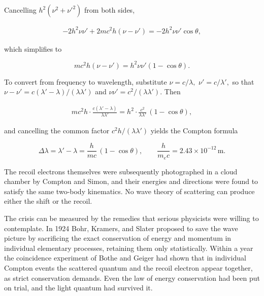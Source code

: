 Cancelling $h^{2}(\nu^{2}+\nu'^{2})$ from both sides,
\begin{linenomath}
    \begin{align}
        -2h^{2}\nu\nu'+2mc^{2}h(\nu-\nu')=-2h^{2}\nu\nu'\cos\theta,
    \end{align}
\end{linenomath}
which simplifies to
\begin{linenomath}
    \begin{equation}
        mc^2h(\nu-\nu')=h^2\nu\nu'(1-\cos\theta).
    \end{equation}
\end{linenomath}
To convert from frequency to wavelength, substitute $\nu=c/\lambda,$ $\nu'=c/\lambda',$ so that $\nu-\nu'=c(\lambda'-\lambda)/(\lambda\lambda')$ and $\nu\nu'=c^{2}/(\lambda\lambda').$ Then
\begin{linenomath}
    \begin{align}
        mc^{2}h\cdot\frac{c(\lambda'-\lambda)}{\lambda\lambda'}
        =h^{2}\cdot\frac{c^{2}}{\lambda\lambda'}\,(1-\cos\theta),
    \end{align}
\end{linenomath}
and cancelling the common factor $c^{2}h/(\lambda\lambda')$ yields the Compton formula
\begin{linenomath}
    \begin{equation}
        \Delta\lambda=\lambda'-\lambda=\frac{h}{mc}\,(1-\cos\theta),
        \qquad
        \frac{h}{m_ec}=2.43\times10^{-12}\,\mathrm{m}.
    \end{equation}
\end{linenomath}
The recoil electrons themselves were subsequently photographed in a cloud chamber by Compton and Simon, and their energies and directions were found to satisfy the same two-body kinematics. No wave theory of scattering can produce either the shift or the recoil.

The crisis can be measured by the remedies that serious physicists were willing to contemplate. In 1924 Bohr, Kramers, and Slater proposed to save the wave picture by sacrificing the exact conservation of energy and momentum in individual elementary processes, retaining them only statistically. Within a year the coincidence experiment of Bothe and Geiger had shown that in individual Compton events the scattered quantum and the recoil electron appear together, as strict conservation demands. Even the law of energy conservation had been put on trial, and the light quantum had survived it.

